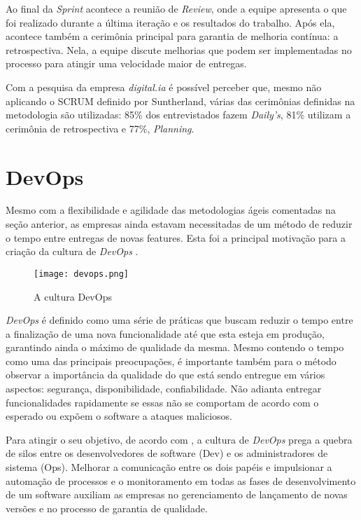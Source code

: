 Ao final da \emph{Sprint} acontece a reunião de \emph{Review}, onde a equipe apresenta o que foi realizado durante a última iteração e os resultados do trabalho. Após ela, acontece também a cerimônia principal para garantia de melhoria contínua: a retrospectiva. Nela, a equipe discute melhorias que podem ser implementadas no processo para atingir uma velocidade maior de entregas.

Com a pesquisa da empresa \emph{digital.ia} \cite{stateAgileReport2020} é possível perceber que, mesmo não aplicando o SCRUM definido por Suntherland, várias das cerimônias definidas na metodologia são utilizadas: 85\% dos entrevistados fazem \emph{Daily's}, 81\% utilizam a cerimônia de retrospectiva e 77\%, \emph{Planning}. 

\section{DevOps}

Mesmo com a flexibilidade e agilidade das metodologias ágeis comentadas na seção anterior, as empresas ainda estavam necessitadas de um método de reduzir o tempo entre entregas de novas features. Esta foi a principal motivação para a criação da cultura de \emph{DevOps} \cite{devopsBook}. 

\begin{figure}[ht]
\begin{center}
\texttt{[image: devops.png]}
\end{center}
\caption[A cultura DevOps]{
    A cultura DevOps
}\label{devops}
\end{figure}

\emph{DevOps} é definido como uma série de práticas que buscam reduzir o tempo entre a finalização de uma nova funcionalidade até que esta esteja em produção, garantindo ainda o máximo de qualidade da mesma. Mesmo contendo o tempo como uma das principais preocupações, é importante também para o método observar a importância da qualidade do que está sendo entregue em vários aspectos: segurança, disponibilidade, confiabilidade. Não adianta entregar funcionalidades rapidamente se essas não se comportam de acordo com o esperado ou expõem o software a ataques maliciosos.

Para atingir o seu objetivo, de acordo com \cite{devopsWiki}, a cultura de \emph{DevOps} prega a quebra de silos entre os desenvolvedores de software (Dev) e os administradores de sistema (Ops). Melhorar a comunicação entre os dois papéis e impulsionar a automação de processos e o monitoramento em todas as fases de desenvolvimento de um software auxiliam as empresas no gerenciamento de lançamento de novas versões e no processo de garantia de qualidade.

